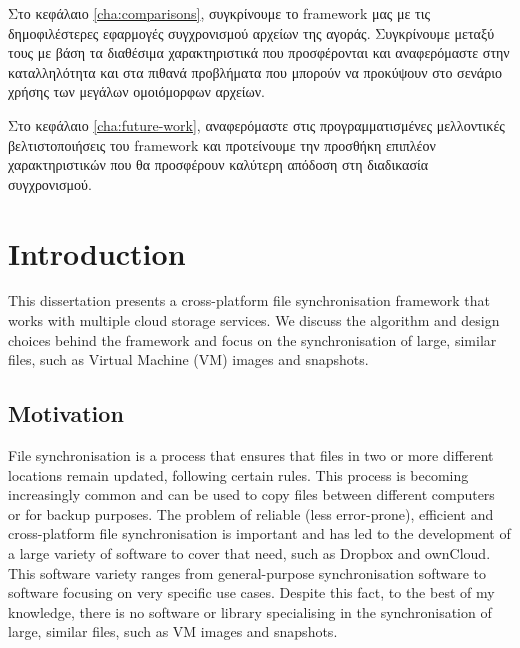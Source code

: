   Στο κεφάλαιο \ref{cha:comparisons}, συγκρίνουμε το framework μας με τις δημοφιλέστερες εφαρμογές συγχρονισμού αρχείων της αγοράς. Συγκρίνουμε μεταξύ τους με βάση τα διαθέσιμα χαρακτηριστικά που προσφέρονται και αναφερόμαστε στην καταλληλότητα και στα πιθανά προβλήματα που μπορούν να προκύψουν στο σενάριο χρήσης των μεγάλων ομοιόμορφων αρχείων.

  Στο κεφάλαιο \ref{cha:future-work}, αναφερόμαστε στις προγραμματισμένες μελλοντικές βελτιστοποιήσεις του framework και προτείνουμε την προσθήκη επιπλέον χαρακτηριστικών που θα προσφέρουν καλύτερη απόδοση στη διαδικασία συγχρονισμού.



\setcounter{chapter}{0}
\chapter{Introduction}

This dissertation presents a cross-platform file synchronisation framework that works with multiple cloud storage services. We discuss the algorithm and design choices behind the framework and focus on the synchronisation of large, similar files, such as Virtual Machine (VM) images and snapshots.

\section{Motivation}
  File synchronisation is a process that ensures that files in two or more different locations remain updated, following certain rules. This process is becoming increasingly common and can be used to copy files between different computers or for backup purposes. The problem of reliable (less error-prone), efficient and cross-platform file synchronisation is important and has led to the development of a large variety of software to cover that need, such as Dropbox and ownCloud. This software variety ranges from general-purpose synchronisation software to software focusing on very specific use cases. Despite this fact, to the best of my knowledge, there is no software or library specialising in the synchronisation of large, similar files, such as VM images and snapshots.

